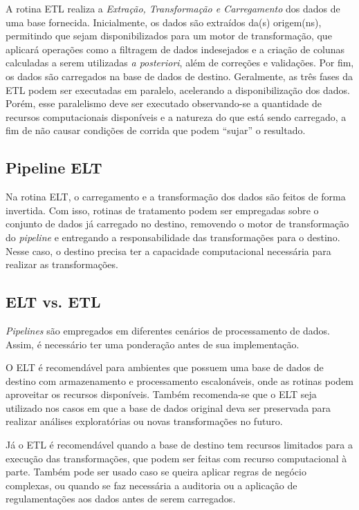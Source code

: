 \label{subsec:ETL_Pipeline}
A rotina ETL realiza a \textit{Extração, Transformação e Carregamento} dos dados de uma base fornecida. Inicialmente, os dados são extraídos da(s) origem(ns), permitindo que  sejam disponibilizados para um motor de transformação, que aplicará operações como a filtragem de dados indesejados e a criação de colunas calculadas a serem utilizadas  \textit{a posteriori}, além de correções e validações. Por fim, os dados são carregados na base de dados de destino.
Geralmente, as três fases da ETL podem ser executadas em paralelo, acelerando a disponibilização dos dados. Porém, esse paralelismo deve ser executado observando-se a quantidade de recursos computacionais disponíveis e a natureza do que está sendo carregado, a fim de não causar condições de corrida que podem ``sujar'' o resultado. \cite{Guia_de_ETL}


\subsection{Pipeline ELT}


Na rotina ELT, o carregamento e a transformação dos dados são feitos de forma invertida. Com isso, rotinas de tratamento podem ser empregadas sobre o conjunto de dados já carregado no destino, removendo o motor de transformação do \textit{pipeline} e entregando a responsabilidade das transformações para o destino. Nesse caso, o destino precisa ter a capacidade computacional necessária para realizar as transformações. \cite{Guia_de_ETL}


\subsection{ELT vs. ETL}


\textit{Pipelines} são empregados em diferentes cenários  de processamento de dados. Assim, é necessário ter uma ponderação antes de sua implementação.

O ELT é recomendável para ambientes que possuem uma base de dados de destino com armazenamento e processamento escalonáveis, onde as rotinas podem  aproveitar os recursos disponíveis. Também recomenda-se que o ELT seja utilizado nos casos em que a base de dados original deva ser preservada para realizar análises exploratórias ou novas transformações no futuro.

Já o  ETL é recomendável quando a base de destino tem recursos limitados para a execução das transformações, que podem ser feitas com recurso computacional à parte. Também pode ser usado caso se queira aplicar regras de negócio complexas, ou quando se faz necessária a auditoria ou a aplicação de regulamentações aos dados antes de serem carregados. \cite{Guia_de_ETL}


